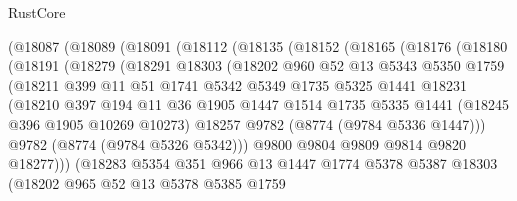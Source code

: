 \begin{lexlean}{RustCore}
\begin{coremodule}
      (@18087
        (@18089
          (@18091
            (@18112
              (@18135
                (@18152
                  (@18165
                    (@18176
                      (@18180
                        (@18191
                          (@18279
                            (@18291
                              @18303
                              (@18202
                                @960
                                @52
                                @13
                                @5343
                                @5350
                                @1759
                                (@18211
                                  @399
                                  @11
                                  @51
                                  @1741
                                  @5342
                                  @5349
                                  @1735
                                  @5325
                                  @1441
                                  @18231
                                  (@18210
                                    @397
                                    @194
                                    @11
                                    @36
                                    @1905
                                    @1447
                                    @1514
                                    @1735
                                    @5335
                                    @1441
                                    (@18245 @396 @1905 @10269 @10273)
                                    @18257
                                    @9782
                                    (@8774 (@9784 @5336 @1447)))
                                  @9782
                                  (@8774 (@9784 @5326 @5342)))
                                @9800
                                @9804
                                @9809
                                @9814
                                @9820
                                @18277)))
                          (@18283
                            @5354
                            @351
                            @966
                            @13
                            @1447
                            @1774
                            @5378
                            @5387
                            @18303
                            (@18202
                              @965
                              @52
                              @13
                              @5378
                              @5385
                              @1759

\end{coremodule}
\end{lexlean}
